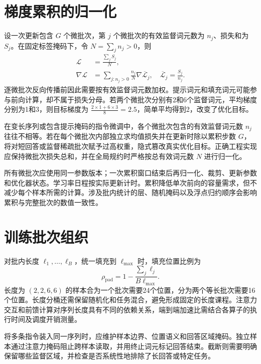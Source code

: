 \documentclass[../textbook.tex]{subfiles}
\begin{document}
\section{梯度累积的归一化}

设一次更新包含 $G$ 个微批次，第 $j$ 个微批次的有效监督词元数为 $n_j$、损失和为 $S_j$。在固定标签掩码下，令 $N=\sum_j n_j>0$，则
\begin{equation}
 \begin{aligned}
  \mathcal L &= \frac{\sum_j S_j}{N}, \\
  \nabla\mathcal L &= \sum_{j:n_j>0}\frac{n_j}{N}\nabla\overline{\mathcal L}_j, \quad \overline{\mathcal L}_j=\frac{S_j}{n_j}.
 \end{aligned}
\end{equation}
逐微批次反向传播前因此需要按有效监督词元数加权。提示词元和填充词元可能参与前向计算，却不属于损失分母。若两个微批次分别有2和6个监督词元，平均梯度分别为1和3，则目标梯度为 $\frac{2\times1+6\times3}{8}=2.5$，简单平均得到2，改变了优化目标。

\begin{warning}[梯度累积的微批次加权归一化陷阱]
在变长序列或包含提示掩码的指令微调中，各个微批次包含的有效监督词元数 $n_j$ 往往不相等。若在每个微批次内部独立求均值损失并在更新时除以累积步数 $G$，将对短回答或监督稀疏批次赋予过高权重，隐式篡改真实优化目标。正确工程实现应保持微批次损失总和，并在全局规约时严格按总有效词元数 $N$ 进行归一化。
\end{warning}

所有微批次应使用同一参数版本；一次累积窗口结束后再归一化、裁剪、更新参数和优化器状态。学习率日程按实际更新计时。累积降低单次前向的容量需求，但不减少每个样本所需的计算。涉及批内统计的层、随机掩码以及浮点归约顺序会影响累积与完整批次的数值一致性。

\section{训练批次组织}

对批内长度 $\ell_1,\ldots,\ell_B$，统一填充到 $\ell_{\max}$ 时，填充位置比例为
\begin{equation}
 \rho_{\mathrm{pad}}=1-\frac{\sum_j\ell_j}{B\ell_{\max}}.
\end{equation}
长度为 $(2,2,6,6)$ 的样本合为一个批次需要24个位置，分为两个等长批次需要16个位置。长度分桶还需保留随机化和任务混合，避免形成固定的长度课程。注意力交互和前馈计算对序列长度具有不同的依赖关系，端到端加速比需结合各算子的执行时间及调度开销测量。

将多条指令装入同一序列时，应维护样本边界、位置语义和回答区域掩码。独立样本通过注意力掩码阻止跨样本读取，并用终止词元标记回答结束。截断则需要明确保留哪些监督区域，并检查是否系统性地排除了长回答或特定任务。
\end{document}
